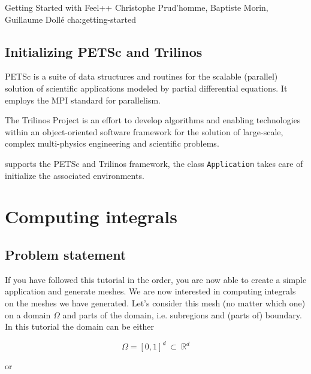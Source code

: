             {Getting Started with Feel++}
            {Christophe Prud'homme, Baptiste Morin, Guillaume Dollé}
            {cha:getting-started}





\subsection{Initializing PETSc and Trilinos}


PETSc is a suite of data structures and routines for the scalable (parallel)
solution of scientific applications modeled by partial differential
equations. It employs the MPI standard for parallelism.

The Trilinos Project is an effort to develop algorithms and enabling
technologies within an object-oriented software framework for the solution of
large-scale, complex multi-physics engineering and scientific problems.

\feel supports the PETSc and Trilinos framework, the class
\lstinline!Application! takes care of initialize the
associated environments.




%


\section{Computing integrals}
\label{sec:computing-integrals}

\subsection{Problem statement}

If you have followed this tutorial in the order, you are now able to create a simple application and generate meshes. We are now interested in computing integrals on the meshes we have generated. Let's consider this mesh (no matter which one) on a domain $\Omega$ and parts of the domain, i.e. subregions and (parts of) boundary. In this tutorial the domain can be either

\[ \Omega=[0,1]^d\ \subset\ \mathbb{R}^d \]

or

